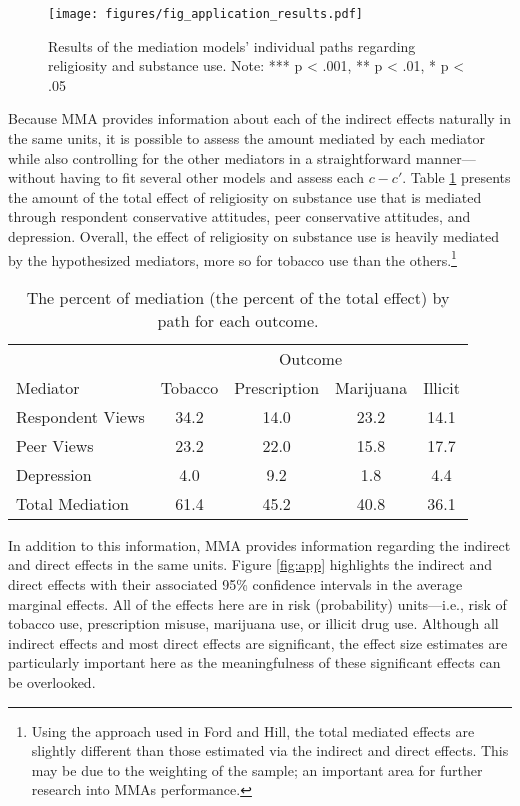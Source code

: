 \documentclass[]{DissertateUSU}
\let\rmarkdownfootnote\footnote%
\def\footnote{\protect\rmarkdownfootnote}
\begin{document}
\begin{figure}[tb]
\centering
\texttt{[image: figures/fig\_application\_results.pdf]}
\caption{Results of the mediation models' individual paths regarding religiosity and substance use. Note: *** p < .001, ** p < .01, * p < .05}
\label{fig:appresults}
\end{figure}

Because MMA provides information about each of the indirect effects
naturally in the same units, it is possible to assess the amount
mediated by each mediator while also controlling for the other mediators
in a straightforward manner---without having to fit several other models
and assess each \(c - c'\). Table \ref{tab:perc} presents the amount of
the total effect of religiosity on substance use that is mediated
through respondent conservative attitudes, peer conservative attitudes,
and depression. Overall, the effect of religiosity on substance use is
heavily mediated by the hypothesized mediators, more so for tobacco use
than the
others.\footnote{Using the approach used in Ford and Hill, the total mediated effects are slightly different than those estimated via the indirect and direct effects. This may be due to the weighting of the sample; an important area for further research into MMAs performance.}

\begin{table}[htb]
\centering
\caption{The percent of mediation (the percent of the total effect) by path for each outcome.}
\begin{tabular}{lcccc}
\toprule
            & \multicolumn{4}{c}{Outcome} \\
   Mediator & Tobacco & Prescription & Marijuana & Illicit \\ 
\midrule
Respondent Views  & 34.2  & 14.0  & 23.2 & 14.1 \\ 
Peer Views        & 23.2  & 22.0  & 15.8 & 17.7 \\ 
Depression        & 4.0   & 9.2   & 1.8  & 4.4 \\ 
Total Mediation   & 61.4  & 45.2  & 40.8 & 36.1 \\ 
\bottomrule
\end{tabular}\label{tab:perc}
\end{table}

In addition to this information, MMA provides information regarding the
indirect and direct effects in the same units. Figure \ref{fig:app}
highlights the indirect and direct effects with their associated 95\%
confidence intervals in the average marginal effects. All of the effects
here are in risk (probability) units---i.e., risk of tobacco use,
prescription misuse, marijuana use, or illicit drug use. Although all
indirect effects and most direct effects are significant, the effect
size estimates are particularly important here as the meaningfulness of
these significant effects can be overlooked.
\end{document}

